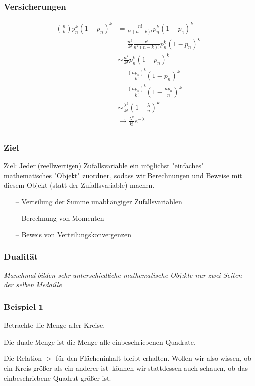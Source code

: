\documentclass{beamer}
\begin{document}
\begin{frame}
\frametitle{Versicherungen}
{\footnotesize
  \begin{align*}
  {n \choose k} p_n^k(1-p_n)^k &= \frac{n!}{k!(n-k)!} p_n^k(1-p_n)^k\\
  &= \frac{n^k}{k!} \frac{n!}{n^k(n-k)!} p_n^k(1-p_n)^k\\
  &\sim \frac{n^k}{k!} p_n^k(1-p_n)^k\\
  &= \frac{(np_n)^k}{k!}(1-p_n)^k\\
  &= \frac{(np_n)^k}{k!}(1-\frac{np_n}{n})^k\\
  &\sim \frac{\lambda^k}{k!}(1-\frac{\lambda}{n})^k\\
  &\to \frac{\lambda^k}{k!}e^{-\lambda}\\
  \end{align*}
}%
\end{frame}

\begin{frame}
\frametitle{Ziel}
Ziel: Jeder (reellwertigen) Zufallsvariable ein möglichst "einfaches" mathematisches "Objekt" zuordnen, sodass wir Berechnungen und Beweise mit diesem Objekt (statt der Zufallsvariable) machen.
\hfill \newline
\begin{itemize}
    \item[--] Verteilung der Summe unabhängiger Zufallsvariablen
    \item[--] Berechnung von Momenten
    \item[--] Beweis von Verteilungskonvergenzen
\end{itemize}
\end{frame}


\begin{frame}
\frametitle{Dualität}
\textit{Manchmal bilden sehr unterschiedliche mathematische Objekte nur zwei Seiten der selben Medaille}
\end{frame}

\begin{frame}
\frametitle{Beispiel 1}
Betrachte die Menge aller Kreise.

Die duale Menge ist die Menge alle einbeschriebenen Quadrate.

Die Relation $>$ für den Flächeninhalt bleibt erhalten. Wollen wir also wissen, ob ein Kreis größer als ein anderer ist, können wir stattdessen auch schauen, ob das einbeschriebene Quadrat größer ist.
\end{frame}
\end{document}
